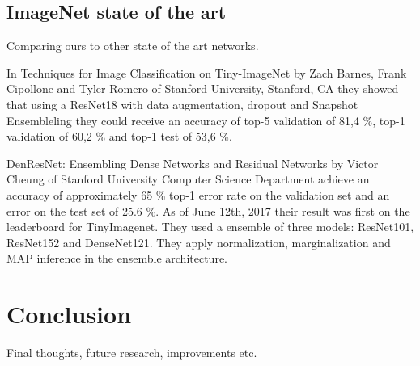 \documentclass{kthreport}
\begin{document}
\subsection{ImageNet state of the art}

Comparing ours to other state of the art networks.

In Techniques for Image Classification on Tiny-ImageNet by Zach Barnes, Frank Cipollone and Tyler Romero of Stanford University, Stanford, CA they showed that using a ResNet18 with data augmentation, dropout and Snapshot Ensembleling they could receive an accuracy of top-5 validation of 81,4 \%, top-1 validation of 60,2 \% and top-1 test of 53,6 \%.


DenResNet: Ensembling Dense Networks and Residual Networks by Victor Cheung of Stanford University Computer Science Department achieve an accuracy of approximately 65 \% top-1 error rate on the validation set and an error on the test set of 25.6 \%. As of June 12th, 2017 their result was first on the leaderboard for TinyImagenet. They used a  ensemble of three models: ResNet101, ResNet152 and DenseNet121. They apply normalization, marginalization and MAP inference in the ensemble architecture.

\section{Conclusion}
Final thoughts, future research, improvements etc.



{}

\end{document}

